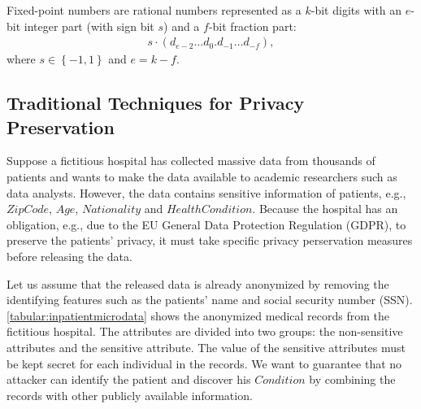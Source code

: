 Fixed-point numbers are rational numbers represented as a $k$-bit digits with an $e$-bit integer part (with sign bit $s$) and a $f$-bit fraction part:
\begin{equation}
    \begin{split}
        s \cdot \left(d_{e-2}\ldots d_0. d_{-1}\ldots d_{-f}\right) ,
    \end{split}
\end{equation}
where $s \in \left\{-1,1\right\} $ and $e=k-f$.


\subsection{Traditional Techniques for Privacy Preservation}
Suppose a fictitious hospital has collected massive data from thousands of patients and wants to make the data available to academic researchers such as data analysts. However, the data contains sensitive information of patients, e.g., $Zip Code$, $Age$, $Nationality$ and $Health Condition$. Because the hospital has an obligation, e.g., due to the EU General Data Protection Regulation (GDPR), to preserve the patients' privacy, it must take specific privacy perservation measures before releasing the data.

Let us assume that the released data is already anonymized by removing the identifying features such as the patients' name and social security number (SSN).
\autoref{tabular:inpatientmicrodata} shows the anonymized medical records from the fictitious hospital. The attributes are divided into two groups: the non-sensitive attributes and the sensitive attribute. The value of the sensitive attributes must be kept secret for each individual in the records. We want to guarantee that no attacker can identify the patient and discover his $Condition$ by combining the records with other publicly available information.

